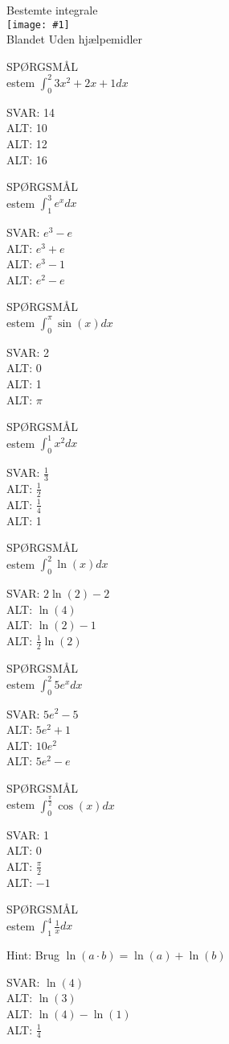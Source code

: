 \documentclass[]{article}
\newcounter{spgcounter}
\newenvironment{question}[2]{\addtocounter{spgcounter}{1} SPØRGSMÅL \thespgcounter\\}{\hspace{50px}}
\newcommand{\name}[1]{{\huge #1}\\}
\newcommand{\tag}[1]{#1}
\newcommand{\cover}[1]{\texttt{[image: \#1]}\\}
\newcommand{\answer}[1]{{\color{green} SVAR: #1}\\}
\newcommand{\alt}[1]{{\color{red} ALT: #1}\\}
\begin{document}
\name{Bestemte integrale}
\cover{bestemteintegrale.png}
\tag{Blandet}
\tag{Uden hjælpemidler}

\begin{question}{multi}

Bestem $\int_0^2 3x^2 + 2x + 1 dx$

\answer{14}
\alt{10}
\alt{12}
\alt{16}

\end{question}

\begin{question}{multi}

Bestem $\int_1^3 e^x dx$

\answer{$e^3 - e$}
\alt{$e^3 + e$}
\alt{$e^3 - 1$}
\alt{$e^2 - e$}

\end{question}

\begin{question}{multi}

Bestem $\int_0^{\pi} \sin(x) dx$

\answer{2}
\alt{0}
\alt{1}
\alt{$\pi$}

\end{question}

\begin{question}{multi}

Bestem $\int_0^1 x^2 dx$

\answer{$\frac{1}{3}$}
\alt{$\frac{1}{2}$}
\alt{$\frac{1}{4}$}
\alt{1}

\end{question}

\begin{question}{multi}

Bestem $\int_0^2 \ln(x) dx$

\answer{$2\ln(2) - 2$}
\alt{$\ln(4)$}
\alt{$\ln(2) - 1$}
\alt{$\frac{1}{2}\ln(2)$}

\end{question}

\begin{question}{multi}

Bestem $\int_0^2 5e^x dx$

\answer{$5e^2 - 5$}
\alt{$5e^2 + 1$}
\alt{$10e^2$}
\alt{$5e^2 - e$}

\end{question}

\begin{question}{multi}

Bestem $\int_0^{\frac{\pi}{2}} \cos(x) dx$

\answer{1}
\alt{0}
\alt{$\frac{\pi}{2}$}
\alt{$-1$}

\end{question}

\begin{question}{multi}

Bestem $\int_1^4 \frac{1}{x} dx$

Hint: Brug $\ln(a\cdot b) = \ln(a)+\ln(b)$

\answer{$\ln(4)$}
\alt{$\ln(3)$}
\alt{$\ln(4) - \ln(1)$}
\alt{$\frac{1}{4}$}

\end{question}
\end{document}
